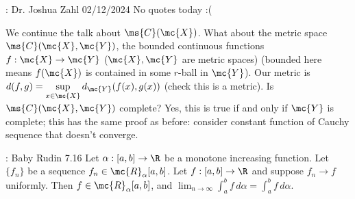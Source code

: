 \begin{nquote}{: Dr. Joshua Zahl 02/12/2024}
	No quotes today :(
\end{nquote}

We continue the talk about \(\ms{C}(\mc{X})\). What about the metric space \(\ms{C}(\mc{X},\mc{Y})\), the bounded continuous functions \(f:\mc{X}\to\mc{Y}\) (\(\mc{X},\mc{Y}\) are metric spaces) (bounded here means \(f(\mc{X})\) is contained in some \(r\)-ball in \(\mc{Y}\)). Our metric is \(d(f,g)=\displaystyle\sup_{x\in\mc{X}}d_{\mc{Y}}(f(x),g(x))\) (check this is a metric). Is \(\ms{C}(\mc{X},\mc{Y})\) complete? Yes, this is true if and only if \(\mc{Y}\) is complete; this has the same proof as before: consider constant function of Cauchy sequence that doesn't converge.

\begin{ntheorem}{: Baby Rudin 7.16}
	Let \(\alpha:[a,b]\to\R\) be a monotone increasing function. Let \(\{f_n\}\) be a sequence \(f_n\in\mc{R}_{\alpha}[a,b]\). Let \(f:[a,b]\to\R\) and suppose \(f_n\to f\) uniformly. Then \(f\in\mc{R}_{\alpha}[a,b]\), and \(\displaystyle\lim_{n\to\infty}\int_a^b f \, d\alpha=\int_a^b f \, d\alpha\).
\end{ntheorem}
